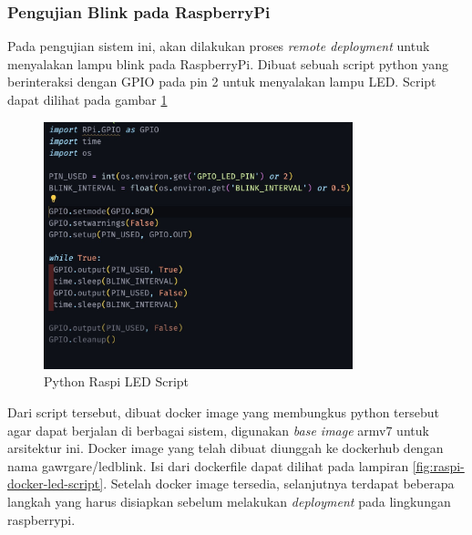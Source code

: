 \subsubsection{Pengujian Blink pada RaspberryPi}

Pada pengujian sistem ini, akan dilakukan proses \textit{remote deployment} untuk menyalakan lampu blink pada RaspberryPi. Dibuat sebuah script python yang berinteraksi dengan GPIO pada pin 2 untuk menyalakan lampu LED. Script dapat dilihat pada gambar \ref{fig:raspi-python-led-script}

\begin{figure}[ht]
  \centering
  \includegraphics[width=0.8\textwidth]{resources/chapter-4/pengujian/pengujian-sistem-raspi-09-led.jpg}
  \caption{Python Raspi LED Script}
  \label{fig:raspi-python-led-script}
\end{figure}

Dari script tersebut, dibuat docker image yang membungkus python tersebut agar dapat berjalan di berbagai sistem, digunakan \textit{base image} armv7 untuk arsitektur ini. Docker image yang telah dibuat diunggah ke dockerhub dengan nama {gawrgare/led\textunderscore blink}. Isi dari dockerfile dapat dilihat pada lampiran \ref{fig:raspi-docker-led-script}. Setelah docker image tersedia, selanjutnya terdapat beberapa langkah yang harus disiapkan sebelum melakukan \textit{deployment} pada lingkungan raspberrypi.


